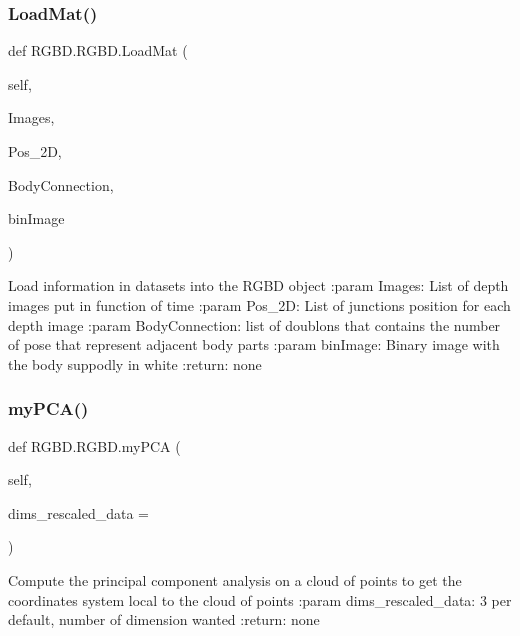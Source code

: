 \subsubsection{\texorpdfstring{Load\+Mat()}{LoadMat()}}
{\footnotesize\ttfamily def R\+G\+B\+D.\+R\+G\+B\+D.\+Load\+Mat (\begin{DoxyParamCaption}\item[{}]{self,  }\item[{}]{Images,  }\item[{}]{Pos\+\_\+2D,  }\item[{}]{Body\+Connection,  }\item[{}]{bin\+Image }\end{DoxyParamCaption})}

\begin{DoxyVerb}Load information in datasets into the RGBD object
:param Images: List of depth images put in function of time
:param Pos_2D: List of junctions position for each depth image
:param BodyConnection: list of doublons that contains the number of pose that represent adjacent body parts
:param binImage: Binary image with the body suppodly in white
:return:  none
\end{DoxyVerb}
 \mbox{\label{class_r_g_b_d_1_1_r_g_b_d_a62a33614ece39d6ddd215f9faae0bc4d}} 
\subsubsection{\texorpdfstring{my\+P\+C\+A()}{myPCA()}}
{\footnotesize\ttfamily def R\+G\+B\+D.\+R\+G\+B\+D.\+my\+P\+CA (\begin{DoxyParamCaption}\item[{}]{self,  }\item[{}]{dims\+\_\+rescaled\+\_\+data = {} }\end{DoxyParamCaption})}

\begin{DoxyVerb}Compute the principal component analysis on a cloud of points
to get the coordinates system local to the cloud of points
:param dims_rescaled_data: 3 per default, number of dimension wanted
:return:  none
\end{DoxyVerb}
 \mbox{\label{class_r_g_b_d_1_1_r_g_b_d_a9cba8018f1cdb3f5c73c863a49549061}} 
